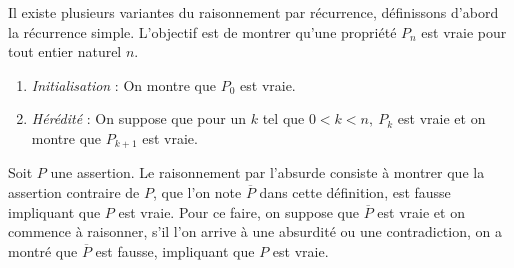 \begin{definition}
    Il existe plusieurs variantes du raisonnement par récurrence, définissons d'abord la récurrence simple. L'objectif est de montrer qu'une propriété $P_n$ est vraie pour tout entier naturel $n$. 
    \begin{enumerate}
        \item \emph{Initialisation} : On montre que $P_0$ est vraie.
        \item \emph{Hérédité} : On suppose que pour un $k$ tel que $0 < k < n,\ P_k$ est vraie et on montre que $P_{k+1}$ est vraie.
    \end{enumerate}
\end{definition}

\begin{definition}
    Soit $P$ une assertion. Le raisonnement par l'absurde consiste à montrer que la assertion contraire de $P$, que l'on note $\overline{P}$ dans cette définition, est fausse impliquant que $P$ est vraie.
    Pour ce faire, on suppose que $\overline{P}$ est vraie et on commence à raisonner, s'il l'on arrive à une absurdité ou une contradiction, on a montré que $\overline{P}$ est fausse, impliquant que $P$ est vraie.
\end{definition}